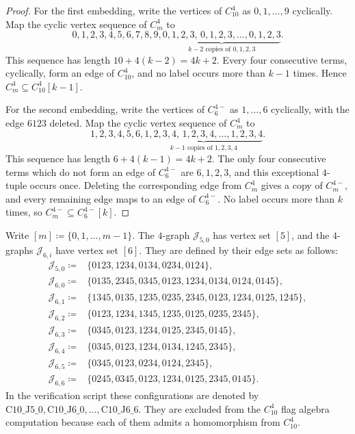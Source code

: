 \documentclass[10pt,a4paper]{article}
\theoremstyle{plain}
\theoremstyle{definition}
\begin{document}
\begin{proof}
For the first embedding, write the vertices of $C_{10}^4$ as $0,1,\ldots,9$ cyclically.  Map the cyclic vertex sequence of $C_m^4$ to
\[
0,1,2,3,4,5,6,7,8,9,
\underbrace{0,1,2,3,\,0,1,2,3,\ldots,0,1,2,3}_{k-2\text{ copies of }0,1,2,3}.
\]
This sequence has length $10+4(k-2)=4k+2$.  Every four consecutive terms, cyclically, form an edge of $C_{10}^4$, and no label occurs more than $k-1$ times.  Hence $C_m^4\subseteq C_{10}^4[k-1]$.

For the second embedding, write the vertices of $C_6^{4-}$ as $1,\ldots,6$ cyclically, with the edge $6123$ deleted.  Map the cyclic vertex sequence of $C_m^{4}$ to
\[
1,2,3,4,5,6,
\underbrace{1,2,3,4,\,1,2,3,4,\ldots,1,2,3,4}_{k-1\text{ copies of }1,2,3,4}.
\]
This sequence has length $6+4(k-1)=4k+2$.  The only four consecutive terms which do not form an edge of $C_6^{4-}$ are $6,1,2,3$, and this exceptional $4$-tuple occurs once.  Deleting the corresponding edge from $C_m^4$ gives a copy of $C_m^{4-}$, and every remaining edge maps to an edge of $C_6^{4-}$.  No label occurs more than $k$ times, so $C_m^{4-}\subseteq C_6^{4-}[k]$.
\end{proof}

Write $[m]\coloneqq\{0,1,\ldots,m-1\}$.  The $4$-graph $\mathcal J_{5,0}$ has vertex set $[5]$, and the $4$-graphs $\mathcal J_{6,i}$ have vertex set $[6]$.  They are defined by their edge sets as follows:
\[
\begin{aligned}
\mathcal J_{5,0}\coloneqq{}&
\{0123,1234,0134,0234,0124\},\\
\mathcal J_{6,0}\coloneqq{}&
\{0135,2345,0345,0123,1234,0134,0124,0145\},\\
\mathcal J_{6,1}\coloneqq{}&
\{1345,0135,1235,0235,2345,0123,1234,0125,1245\},\\
\mathcal J_{6,2}\coloneqq{}&
\{0123,1234,1345,1235,0125,0235,2345\},\\
\mathcal J_{6,3}\coloneqq{}&
\{0345,0123,1234,0125,2345,0145\},\\
\mathcal J_{6,4}\coloneqq{}&
\{0345,0123,1234,0134,1245,2345\},\\
\mathcal J_{6,5}\coloneqq{}&
\{0345,0123,0234,0124,2345\},\\
\mathcal J_{6,6}\coloneqq{}&
\{0245,0345,0123,1234,0125,2345,0145\}.
\end{aligned}
\]
In the verification script these configurations are denoted by $\mathrm{C10\_J5\_0}, \mathrm{C10\_J6\_0},\ldots,\mathrm{C10\_J6\_6}$. 
They are excluded from the $C_{10}^4$ flag algebra computation because each of them admits a homomorphism from $C_{10}^4$.
\end{document}
